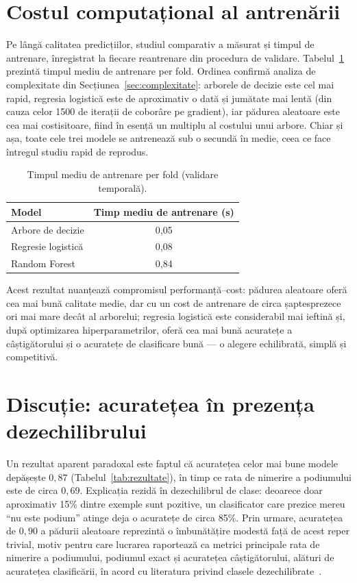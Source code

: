\documentclass[12pt,a4paper]{report}
\begin{document}
\section{Costul computațional al antrenării}
\label{sec:cost}

Pe lângă calitatea predicțiilor, studiul comparativ a măsurat și timpul de antrenare, înregistrat
la fiecare reantrenare din procedura de validare. Tabelul~\ref{tab:timpi} prezintă timpul mediu de
antrenare per fold. Ordinea confirmă analiza de complexitate din Secțiunea~\ref{sec:complexitate}:
arborele de decizie este cel mai rapid, regresia logistică este de aproximativ o dată și jumătate
mai lentă (din cauza celor 1500 de iterații de coborâre pe gradient), iar pădurea aleatoare este cea mai
costisitoare, fiind în esență un multiplu al costului unui arbore. Chiar și așa, toate cele trei
modele se antrenează sub o secundă în medie, ceea ce face întregul studiu rapid de reprodus.

\begin{table}[htbp]
  \centering
  \begin{tabular}{l c}
    \toprule
    \textbf{Model} & \textbf{Timp mediu de antrenare (s)} \\
    \midrule
    Arbore de decizie  & 0,05 \\
    Regresie logistică & 0,08 \\
    Random Forest      & 0,84 \\
    \bottomrule
  \end{tabular}
  \caption{Timpul mediu de antrenare per fold (validare temporală).}
  \label{tab:timpi}
\end{table}

Acest rezultat nuanțează compromisul performanță--cost: pădurea aleatoare oferă cea mai bună
calitate medie, dar cu un cost de antrenare de circa șaptesprezece ori mai mare decât al arborelui;
regresia logistică este considerabil mai ieftină și, după optimizarea hiperparametrilor, oferă cea
mai bună acuratețe a câștigătorului și o acuratețe de clasificare bună --- o alegere echilibrată,
simplă și competitivă.

\section{Discuție: acuratețea în prezența dezechilibrului}
\label{sec:discutie}

Un rezultat aparent paradoxal este faptul că acuratețea celor mai bune modele depășește $0{,}87$
(Tabelul~\ref{tab:rezultate}), în timp ce rata de nimerire a podiumului este de circa $0{,}69$.
Explicația rezidă în dezechilibrul de clase: deoarece doar aproximativ 15\% dintre exemple sunt
pozitive, un clasificator care prezice mereu ``nu este podium'' atinge deja o acuratețe de circa
85\%. Prin urmare, acuratețea de $0{,}90$ a pădurii aleatoare reprezintă o îmbunătățire modestă față
de acest reper trivial, motiv pentru care lucrarea raportează ca metrici principale rata de nimerire
a podiumului,
podiumul exact și acuratețea câștigătorului, alături de acuratețea clasificării, în acord cu
literatura privind clasele dezechilibrate~\cite{saito2015precision, he2009learning}.
\end{document}
